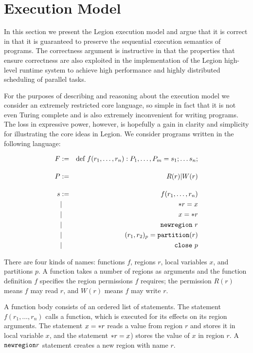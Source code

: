 
\section{Execution Model}
\label{sec:exec}

In this section we present the Legion execution model and argue that
it is correct in that it is guaranteed to preserve the sequential
execution semantics of programs.  The correctness argument is
instructive in that the properties that ensure correctness are also
exploited in the implementation of the Legion high-level runtime
system to achieve high performance and highly distributed scheduling
of parallel tasks.

For the purposes of describing and reasoning about the
execution model we consider an extremely restricted core language, so
simple in fact that it is not even Turing complete and is also extremely
inconvenient for writing programs.  The loss in expressive power, however,
is hopefully a gain in clarity and simplicity for illustrating the core ideas in
Legion.    We consider programs written in the following language:

\begin{eqnarray*}
F & := & \mbox{def}\ f(r_1,\ldots,r_n): P_1,\ldots,P_m  =   s_1; \ldots s_n; \\[.15in]
P & := & R(r) | W(r) \\[.15in]
s & := & f(r_1,\ldots,r_n) \\
&| & \ast r = x \\
& | & x = \ast r \\
&| & \mbox{\tt newregion}\ r \\
&| & (r_1, r_2)_{p} = \mbox{\tt partition}(r) \\ 
&| & \mbox{\tt close}\ p 
\end{eqnarray*}

There are four kinds of names: functions $f$, regions $r$, local
variables $x$, and partitions $p$.  A function takes a number of
regions as arguments and the function definition $f$ specifies the
region permissions $f$ requires; the permission $R(r)$ means $f$ may
read $r$, and $W(r)$ means $f$ may write $r$.  

A function body consists of an ordered list of statements.  The statement
$f(r_1,\ldots,r_n)$ calls a function, which is executed for its effects
on its region arguments.  The statement $x = \ast
r$ reads a value from region $r$ and stores it in local variable $x$,
and the statement $\ast r = x$) stores the value of $x$ in region
$r$.  A $\mbox{\tt newregion} r$ statement creates a new region with
name $r$. 

